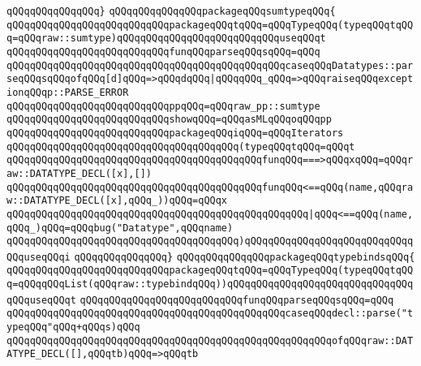 \verb|qQQqqQQqqQQqqQQq}|\newline
\newline
\verb|qQQqqQQqqQQqqQQqpackageqQQqsumtypeqQQq{|\newline
\newline
\verb|qQQqqQQqqQQqqQQqqQQqqQQqqQQqpackageqQQqtqQQq=qQQqTypeqQQq(typeqQQqtqQQq=qQQqraw::sumtype)qQQqqQQqqQQqqQQqqQQqqQQqqQQquseqQQqt|\newline
\verb|qQQqqQQqqQQqqQQqqQQqqQQqqQQqfunqQQqparseqQQqsqQQq=qQQq|\newline
\verb|qQQqqQQqqQQqqQQqqQQqqQQqqQQqqQQqqQQqqQQqqQQqqQQqcaseqQQqDatatypes::parseqQQqsqQQqofqQQq[d]qQQq=>qQQqdqQQq|\verb#|qQQqqQQq_qQQq=>qQQqraiseqQQqexceptionqQQqp::PARSE_ERROR#\newline
\verb|qQQqqQQqqQQqqQQqqQQqqQQqqQQqppqQQq=qQQqraw_pp::sumtype|\newline
\verb|qQQqqQQqqQQqqQQqqQQqqQQqqQQqshowqQQq=qQQqasMLqQQqoqQQqpp|\newline
\verb|qQQqqQQqqQQqqQQqqQQqqQQqqQQqpackageqQQqiqQQq=qQQqIterators|\newline
\verb|qQQqqQQqqQQqqQQqqQQqqQQqqQQqqQQqqQQqqQQq(typeqQQqtqQQq=qQQqt|\newline
\verb|qQQqqQQqqQQqqQQqqQQqqQQqqQQqqQQqqQQqqQQqqQQqfunqQQq===>qQQqxqQQq=qQQqraw::DATATYPE_DECL([x],[])|\newline
\verb|qQQqqQQqqQQqqQQqqQQqqQQqqQQqqQQqqQQqqQQqqQQqfunqQQq<==qQQq(name,qQQqraw::DATATYPE_DECL([x],qQQq_))qQQq=qQQqx|\newline
\verb|qQQqqQQqqQQqqQQqqQQqqQQqqQQqqQQqqQQqqQQqqQQqqQQqqQQq|\verb#|qQQq<==qQQq(name,qQQq_)qQQq=qQQqbug("Datatype",qQQqname)#\newline
\verb|qQQqqQQqqQQqqQQqqQQqqQQqqQQqqQQqqQQqqQQq)qQQqqQQqqQQqqQQqqQQqqQQqqQQqqQQquseqQQqi|\newline
\verb|qQQqqQQqqQQqqQQq}|\newline
\newline
\verb|qQQqqQQqqQQqqQQqpackageqQQqtypebindsqQQq{|\newline
\newline
\verb|qQQqqQQqqQQqqQQqqQQqqQQqqQQqpackageqQQqtqQQq=qQQqTypeqQQq(typeqQQqtqQQq=qQQqqQQqList(qQQqraw::typebindqQQq))qQQqqQQqqQQqqQQqqQQqqQQqqQQqqQQqqQQquseqQQqt|\newline
\verb|qQQqqQQqqQQqqQQqqQQqqQQqqQQqfunqQQqparseqQQqsqQQq=qQQq|\newline
\verb|qQQqqQQqqQQqqQQqqQQqqQQqqQQqqQQqqQQqqQQqqQQqqQQqcaseqQQqdecl::parse("typeqQQq"qQQq+qQQqs)qQQq|\newline
\verb|qQQqqQQqqQQqqQQqqQQqqQQqqQQqqQQqqQQqqQQqqQQqqQQqqQQqqQQqofqQQqraw::DATATYPE_DECL([],qQQqtb)qQQq=>qQQqtb|\newline
